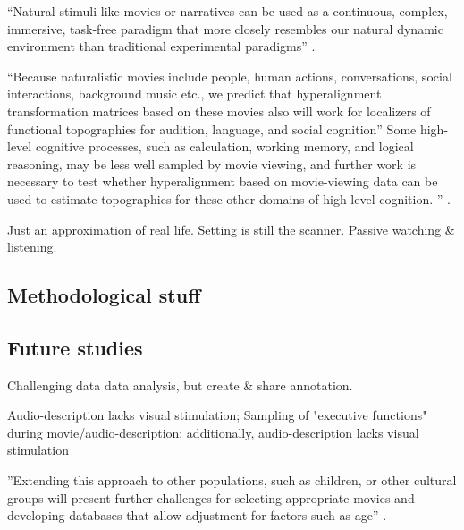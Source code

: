 ``Natural stimuli like movies \citep{eickhoff2020towards,
hasson2008neurocinematics, sonkusare2019naturalistic} or narratives
\citep{hamilton2018revolution, honey2012not, lerner2011topographic,
silbert2014coupled, wilson2008beyond} can be used as a continuous, complex,
immersive, task-free paradigm that more closely resembles our natural dynamic
environment than traditional experimental paradigms''
\citep{haeusler2022processing}.

%
``Because naturalistic movies include people, human actions, conversations,
social interactions, background music etc., we predict that hyperalignment
transformation matrices based on these movies also will work for localizers of
functional topographies for audition, language, and social cognition''
\citep{jiahui2020predicting}
%
Some high-level cognitive processes, such as calculation, working memory, and
logical reasoning, may be less well sampled by movie viewing, and further work
is necessary to test whether hyperalignment based on movie-viewing data can be
used to estimate topographies for these other domains of high-level cognition.
'' \citep{jiahui2020predicting}.


%
Just an approximation of real life.
%
Setting is still the scanner.
%
Passive watching \& listening.



\subsection{Methodological stuff}




\subsection{Future studies}
%
Challenging data data analysis, but create \& share annotation.

%
Audio-description lacks visual stimulation; Sampling of "executive functions"
during movie/audio-description;
%
additionally, audio-description lacks visual stimulation

%
''Extending this approach to other populations, such as children, or other
cultural groups will present further challenges for selecting appropriate movies
and developing databases that allow adjustment for factors such as age''
\citep{jiahui2020predicting}.




